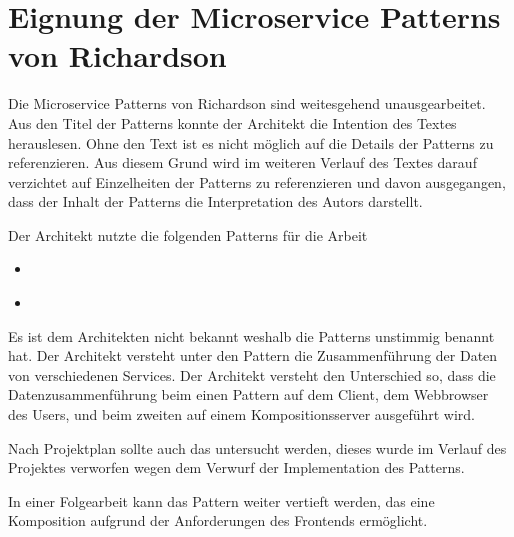 \section{Eignung der Microservice Patterns von Richardson}

Die Microservice Patterns von Richardson sind weitesgehend unausgearbeitet.\cite{microservicesio} Aus den Titel der Patterns konnte der Architekt die Intention des Textes herauslesen. Ohne den Text ist es nicht möglich auf die Details der Patterns zu referenzieren. Aus diesem Grund wird im weiteren Verlauf des Textes darauf verzichtet auf Einzelheiten der Patterns zu referenzieren und davon ausgegangen, dass der Inhalt der Patterns die Interpretation des Autors darstellt.

Der Architekt nutzte die folgenden Patterns für die Arbeit
\begin{itemize}
    \item {}\cite{RichardsonFrontend}
    \item {}\cite{RichardsonFragment}
\end{itemize}

Es ist dem Architekten nicht bekannt weshalb \citeauthor{RichardsonFrontend} die Patterns unstimmig benannt hat. Der Architekt versteht unter den Pattern die Zusammenführung der Daten von verschiedenen Services. Der Architekt versteht den Unterschied so, dass die Datenzusammenführung beim einen Pattern auf dem Client, dem Webbrowser des Users, und beim zweiten auf einem Kompositionsserver ausgeführt wird.

Nach Projektplan sollte auch das \cite{RichardsonAPIGateway} untersucht werden, dieses wurde im Verlauf des Projektes verworfen wegen dem Verwurf der Implementation des Patterns.

In einer Folgearbeit kann das Pattern \cite{RichardsonBFF} weiter vertieft werden, das eine Komposition aufgrund der Anforderungen des Frontends ermöglicht.\cite{newman2015}
